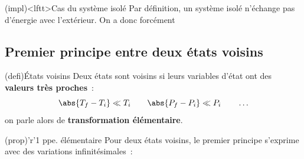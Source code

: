 \documentclass[../../main/main.tex]{subfiles}
\begin{document}
\begin{tcb}(impl)<lftt>{Cas du système isolé}
	Par définition, un système isolé n'échange pas d'énergie avec l'extérieur. On
	a donc forcément
	\psw{%
		\[
			\boxed{\Delta{U} = 0}
		\]
	}%
	\vspace{-15pt}
\end{tcb}

\subsection{Premier principe entre deux états voisins}

\begin{tcbraster}[raster equal height=rows, raster columns=2]
	\begin{tcb}(defi){États voisins}
		Deux états sont voisins si leurs variables d'état ont des \textbf{valeurs
			très proches}~:
		\[
			\abs{T_f - T_i} \ll T_i
			\qquad
			\abs{P_f-P_i} \ll P_i
			\qquad
			\ldots
		\]
		on parle alors de \textbf{transformation élémentaire}.
	\end{tcb}
	\begin{tcb*}[%
			sidebyside, righthand ratio=.5,
			list entry={\hspace*{-20pt}\protect\rcheck~~Premier principe élémentaire}%
		](prop)'r'{1\ier{} ppe. élémentaire}
		Pour deux états voisins, le premier principe s'exprime avec des variations
		infinitésimales~:
		\psw{%
			\[
				\boxed{\dd{U} = \delta W + \delta Q}
			\]
		}%
		\tcblower
		\begin{center}
\end{center}
\end{tcb*}
\end{tcbraster}
\end{document}
